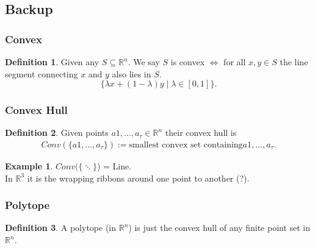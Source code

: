 \documentclass[]{article}
\theoremstyle{definition}
\newtheorem*{defn}{Definition}
\newtheorem{ex}{Example}[section]
\begin{document}
			\subsection{Backup}
			\subsubsection{Convex}
			\begin{defn}
			Given any $S \subseteq \mathbb{R}^n$. We say $S$ is convex $\iff$ for all $x,y \in S$ the line segment connecting $x$ and $y$ also lies in $S$.
			\[ \{ \lambda x + (1-\lambda)y \mid \lambda \in [0,1]\}.\]
			\end{defn}
			\subsubsection{Convex Hull}
			\begin{defn}
			Given points $a1,\ldots,a_\tau \in \mathbb{R}^n$ their convex hull is
			\begin{align*}
			Conv(\{a1,\ldots,a_\tau\}):= \text{smallest convex set containing} a1,\ldots,a_\tau.
			\end{align*} 
			\end{defn}
			\begin{ex}
			$Conv(\{\ddots\}$) = Line.\\
			In $\mathbb{R}^3$ it is the wrapping ribbons around one point to another (?).
			\end{ex}
			\subsubsection{Polytope}
			\begin{defn}
			A polytope (in $\mathbb{R}^n$) is just the convex hull of any finite point set in $\mathbb{R}^n$.
			\end{defn}
\end{document}
